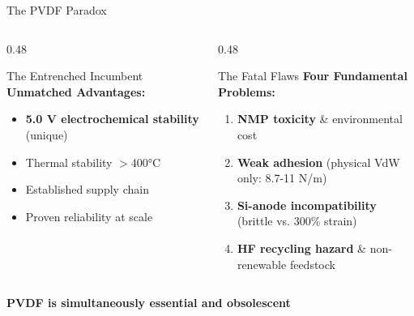\documentclass[aspectratio=169]{beamer}
\begin{document}
\begin{frame}{The PVDF Paradox}
    \begin{columns}[T]
        \begin{column}{0.48\textwidth}
            \begin{block}{The Entrenched Incumbent}
                \textbf{Unmatched Advantages:}
                \begin{itemize}\small
                    \item \textbf{5.0 V electrochemical stability} (unique)
                    \item Thermal stability $>$400\si{\celsius}
                    \item Established supply chain
                    \item Proven reliability at scale
                \end{itemize}
            \end{block}
        \end{column}
        
        \begin{column}{0.48\textwidth}
            \begin{alertblock}{The Fatal Flaws}
                \textbf{Four Fundamental Problems:}
                \begin{enumerate}\small
                    \item \textbf{NMP toxicity} \& environmental cost
                    \item \textbf{Weak adhesion} (physical VdW only: 8.7-11 N/m)
                    \item \textbf{Si-anode incompatibility} (brittle vs. 300\% strain)
                    \item \textbf{HF recycling hazard} \& non-renewable feedstock
                \end{enumerate}
            \end{alertblock}
        \end{column}
    \end{columns}
    
    \vspace{0.3cm}
    \begin{center}
        \Large\textbf{PVDF is simultaneously essential and obsolescent}
    \end{center}
\end{frame}
\end{document}

